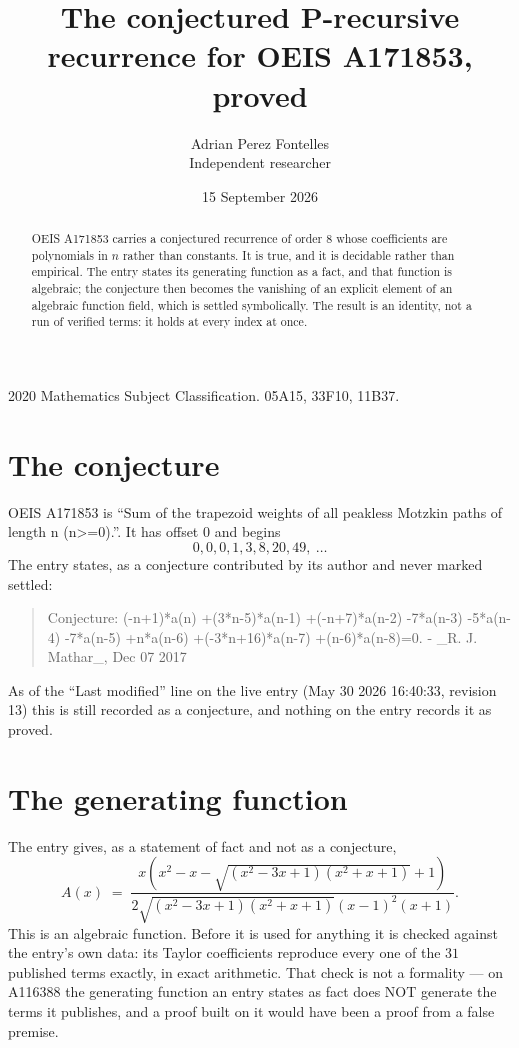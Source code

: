 \documentclass[11pt,a4paper]{article}
\title{The conjectured P-recursive recurrence for OEIS A171853, proved}
\author{Adrian Perez Fontelles\\ \small Independent researcher}
\date{15 September 2026}
\theoremstyle{plain}
\theoremstyle{definition}
\begin{document}
\maketitle

\begin{abstract}
OEIS A171853 carries a conjectured recurrence of order $8$ whose coefficients are polynomials in
$n$ rather than constants. It is true, and it is decidable rather than empirical. The entry
states its generating function as a fact, and that function is algebraic; the conjecture then
becomes the vanishing of an explicit element of an algebraic function field, which is settled
symbolically. The result is an identity, not a run of verified terms: it holds at every index
at once.
\end{abstract}

\noindent\small 2020 Mathematics Subject Classification. 05A15, 33F10, 11B37.\normalsize

\section{The conjecture}

OEIS A171853 is ``Sum of the trapezoid weights of all peakless Motzkin paths of length n (n>=0).''. It has offset $0$ and begins
\[
0, 0, 0, 1, 3, 8, 20, 49,\ \dots
\]
The entry states, as a conjecture contributed by its author and never marked settled:
\begin{quote}\raggedright\small
Conjecture: (-n+1)*a(n) +(3*n-5)*a(n-1) +(-n+7)*a(n-2) -7*a(n-3) -5*a(n-4) -7*a(n-5) +n*a(n-6) +(-3*n+16)*a(n-7) +(n-6)*a(n-8)=0. - \_R. J. Mathar\_, Dec 07 2017
\end{quote}
As of the ``Last modified'' line on the live entry (May 30 2026 16:40:33, revision 13)
this is still recorded as a conjecture, and nothing on the entry records it as proved.

\section{The generating function}

The entry gives, as a statement of fact and not as a conjecture,
\[
A(x)\;=\;\frac{x \left(x^{2} - x - \sqrt{\left(x^{2} - 3 x + 1\right) \left(x^{2} + x + 1\right)} + 1\right)}{2 \sqrt{\left(x^{2} - 3 x + 1\right) \left(x^{2} + x + 1\right)} \left(x - 1\right)^{2} \left(x + 1\right)} .
\]
This is an algebraic function. Before it is used for anything it is checked against the entry's
own data: its Taylor coefficients reproduce every one of the $31$ published terms
exactly, in exact arithmetic. That check is not a formality --- on A116388 the generating
function an entry states as fact does NOT generate the terms it publishes, and a proof built on
it would have been a proof from a false premise.
\end{document}
